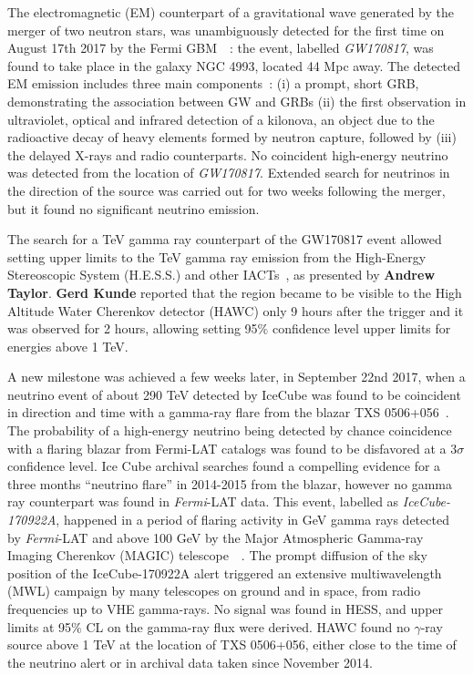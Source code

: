 \documentclass{PoS}
\begin{document}
The  electromagnetic (EM) counterpart of a gravitational wave generated by the merger of two neutron stars, was unambiguously detected for the first time on August 17th 2017 by the Fermi GBM~\cite{Gold2017}~\cite{Abbott2017}: the event, labelled \textit{GW170817}, was found to take place in the galaxy NGC 4993, located 44 Mpc away. The detected EM emission includes three main components~\cite{TheMMpaper}: (i) a prompt, short GRB, demonstrating the association between GW and GRBs (ii) the first observation in ultraviolet, optical and infrared detection of a  kilonova, an object  due to the radioactive decay of heavy elements formed by neutron capture, followed by (iii) the delayed X-rays and radio counterparts. 
No coincident high-energy neutrino was detected  from the location of \textit{GW170817}. Extended search for neutrinos in the direction of the source was carried out for two weeks following the merger, but it found no significant neutrino emission. 

The search for a TeV gamma ray counterpart of the GW170817 event allowed setting upper limits to the TeV gamma ray emission from the High-Energy Stereoscopic System (H.E.S.S.)
and other IACTs~\cite{TheMMpaper}, as presented by {\bf Andrew Taylor}. 
{\bf Gerd Kunde} reported that the region became to be visible
to the High Altitude Water Cherenkov detector (HAWC)
only 9 hours after the trigger and it was observed for 2 hours, allowing setting 95$\%$ confidence level upper limits for energies above 1 TeV. 

A new milestone was achieved a few weeks later, in September 22nd 2017, when a  neutrino event of about 290 TeV detected by IceCube was found to be coincident in direction and time with a gamma-ray flare from the blazar TXS 0506+056~\cite{IceCube:2018dnn}.
The probability of a high-energy neutrino being detected by chance coincidence with a flaring blazar from Fermi-LAT catalogs was found to be disfavored at a 3$\sigma$ confidence level. Ice Cube archival searches  found a compelling evidence for a three months ``neutrino flare'' in 2014-2015 from the blazar, however no gamma ray  counterpart was found in \textit{Fermi}-LAT data. This event, labelled as \textit{IceCube-170922A}, happened in a period of flaring activity in GeV gamma rays detected by \textit{Fermi}-LAT and above 100 GeV by the Major Atmospheric Gamma-ray Imaging Cherenkov (MAGIC) telescope~\cite{IceCube:2018cha}~\cite{MAGIC}.  The prompt diffusion of the sky position of the IceCube-170922A alert triggered an extensive multiwavelength (MWL) campaign by many telescopes on ground and in space, from radio frequencies up to VHE gamma-rays. No signal was found in HESS, and upper limits at 95$\%$ CL on the gamma-ray flux were derived. HAWC found no $\gamma$-ray source above 1 TeV at the location of TXS 0506+056, either close to the time of the neutrino alert or in archival data taken since November 2014.
\end{document}
